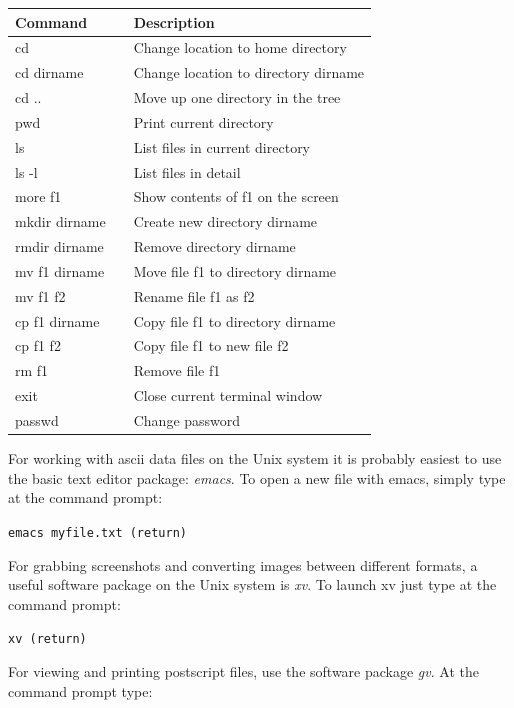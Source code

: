 \documentclass[12pt]{article}
\begin{document}
\begin{table}[h]
\begin{tabular}{lll}
\hline
Command&&Description\\
\hline
cd                &&  Change location to home directory\\
cd dirname        &&  Change location to directory dirname\\
cd ..             &&  Move up one directory in the tree\\
pwd               && Print current directory\\
ls                && List files in current directory\\
ls -l             && List files in detail\\
more f1           && Show contents of f1 on the screen\\
mkdir dirname     &&  Create new directory dirname\\
rmdir dirname     &&  Remove directory dirname\\
mv f1 dirname     && Move file f1 to directory dirname\\
mv f1 f2          && Rename file f1 as f2\\
cp f1 dirname     && Copy file f1 to directory dirname\\
cp f1 f2          && Copy file f1 to new file f2\\
rm f1             && Remove file f1\\
exit              && Close current terminal window\\
passwd            && Change password\\
\hline
\end{tabular}
\end{table}

\medskip 


For working with ascii data files on the Unix system it is probably
easiest to use the basic text editor package: {\it emacs}. To open a new
file with emacs, simply type at the command prompt:

{\tt emacs myfile.txt (return)}

For grabbing screenshots and converting images between different
formats, a useful software package on the Unix system is {\it xv}. To
launch xv just type at the command prompt:

{\tt xv (return)}

For viewing and printing postscript files, use the software package
{\it gv}. At the command prompt type:
\end{document}
